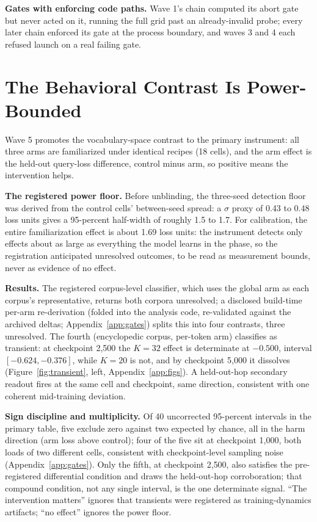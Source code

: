 \documentclass{article} %
\begin{document}
\textbf{Gates with enforcing code paths.} Wave 1's chain computed its
abort gate but never acted on it, running the full grid past an
already-invalid probe; every later chain enforced its gate at the process
boundary, and waves 3 and 4 each refused launch on a real failing gate.

\section{The Behavioral Contrast Is Power-Bounded}
\label{sec:behavioral}

Wave 5 promotes the vocabulary-space contrast to the primary instrument:
all three arms are familiarized under identical recipes (18 cells), and
the arm effect is the held-out query-loss difference, control minus arm,
so positive means the intervention helps.

\textbf{The registered power floor.} Before unblinding, the three-seed
detection floor was derived from the control cells' between-seed spread: a
$\sigma$ proxy of 0.43 to 0.48 loss units gives a 95-percent half-width of
roughly 1.5 to 1.7. %
For calibration, the entire familiarization effect is about 1.69 loss
units: %
the instrument detects only effects about as large as everything the model
learns in the phase, so the registration anticipated unresolved outcomes,
to be read as measurement bounds, never as evidence of no effect.

\textbf{Results.} The registered corpus-level classifier, which uses the
global arm as each corpus's representative, returns both corpora
unresolved; a disclosed build-time per-arm re-derivation (folded into the
analysis code, re-validated against the archived deltas;
Appendix~\ref{app:gates}) splits this into four contrasts, three
unresolved. %
The fourth (encyclopedic corpus, per-token arm) classifies as transient:
at checkpoint 2{,}500 the $K{=}32$ effect is determinate at $-0.500$,
interval $[-0.624, -0.376]$, while $K{=}20$ is not, and by checkpoint
5{,}000 it dissolves
(Figure~\ref{fig:transient}, left, Appendix~\ref{app:figs}). A
held-out-hop secondary readout fires at the same cell and checkpoint, same
direction, %
consistent with one coherent mid-training deviation.

\textbf{Sign discipline and multiplicity.} Of 40 uncorrected 95-percent
intervals in the primary table, five exclude zero against two expected by
chance, all in the harm direction (arm loss above control); four of the
five sit at checkpoint 1{,}000, both loads of two different cells,
consistent with checkpoint-level sampling noise (Appendix~\ref{app:gates}).
Only the fifth, at checkpoint 2{,}500, also satisfies the pre-registered
differential condition and draws the held-out-hop corroboration; that
compound condition, not any single interval, is the one determinate signal.
``The intervention matters'' ignores that transients were registered as
training-dynamics artifacts; ``no effect'' ignores the power floor.
\end{document}
